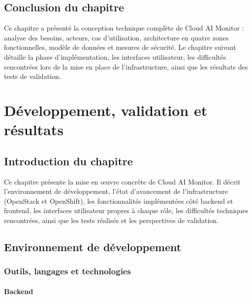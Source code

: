 \documentclass[11pt,a4paper]{report}
\begin{document}
\section*{Conclusion du chapitre}

Ce chapitre a présenté la conception technique complète de Cloud AI Monitor :
analyse des besoins, acteurs, cas d'utilisation, architecture en quatre zones
fonctionnelles, modèle de données et mesures de sécurité. Le chapitre suivant
détaille la phase d'implémentation, les interfaces utilisateur, les
difficultés rencontrées lors de la mise en place de l'infrastructure, ainsi
que les résultats des tests de validation.

\newpage
\chapter{Développement, validation et résultats}

\section*{Introduction du chapitre}

Ce chapitre présente la mise en œuvre concrète de Cloud AI Monitor. Il décrit
l'environnement de développement, l'état d'avancement de l'infrastructure
(OpenStack et OpenShift), les fonctionnalités implémentées côté backend et
frontend, les interfaces utilisateur propres à chaque rôle, les difficultés
techniques rencontrées, ainsi que les tests réalisés et les perspectives de
validation.

\section{Environnement de développement}

\subsection*{Outils, langages et technologies}

\subsubsection*{Backend}
\end{document}
